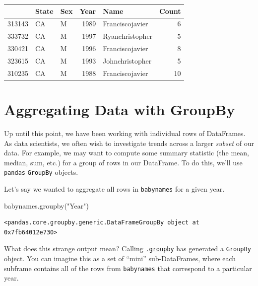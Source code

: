 \documentclass[
  letterpaper,
  DIV=11,
  numbers=noendperiod]{scrreprt}
\newenvironment{Shaded}{\begin{snugshade}}{\end{snugshade}}
\newcommand{\NormalTok}[1]{\textcolor[rgb]{0.00,0.23,0.31}{#1}}
\newcommand{\StringTok}[1]{\textcolor[rgb]{0.13,0.47,0.30}{#1}}
\begin{document}
\begin{tabular}{lllrlr}
\toprule
{} & State & Sex &  Year &             Name &  Count \\
\midrule
313143 &    CA &   M &  1989 &  Franciscojavier &      6 \\
333732 &    CA &   M &  1997 &  Ryanchristopher &      5 \\
330421 &    CA &   M &  1996 &  Franciscojavier &      8 \\
323615 &    CA &   M &  1993 &  Johnchristopher &      5 \\
310235 &    CA &   M &  1988 &  Franciscojavier &     10 \\
\bottomrule
\end{tabular}

\hypertarget{aggregating-data-with-groupby}{%
\section{Aggregating Data with
GroupBy}\label{aggregating-data-with-groupby}}

Up until this point, we have been working with individual rows of
DataFrames. As data scientists, we often wish to investigate trends
across a larger \emph{subset} of our data. For example, we may want to
compute some summary statistic (the mean, median, sum, etc.) for a group
of rows in our DataFrame. To do this, we'll use \texttt{pandas}
\texttt{GroupBy} objects.

Let's say we wanted to aggregate all rows in \texttt{babynames} for a
given year.

\begin{Shaded}
\begin{Highlighting}[]
\NormalTok{babynames.groupby(}\StringTok{"Year"}\NormalTok{)}
\end{Highlighting}
\end{Shaded}

\begin{verbatim}
<pandas.core.groupby.generic.DataFrameGroupBy object at 0x7fb64012e730>
\end{verbatim}

What does this strange output mean? Calling
\href{https://pandas.pydata.org/pandas-docs/stable/reference/api/pandas.DataFrame.groupby.html}{\texttt{.groupby}}
has generated a \texttt{GroupBy} object. You can imagine this as a set
of ``mini'' sub-DataFrames, where each subframe contains all of the rows
from \texttt{babynames} that correspond to a particular year.
\end{document}
